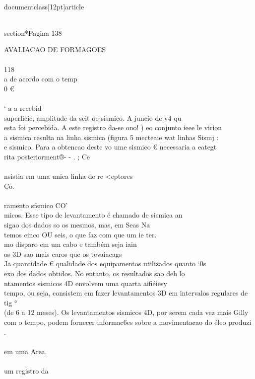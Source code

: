 \\documentclass[12pt]{article}
\begin{document}
\\section*{Pagina 138}

AVALIACAO DE FORMAGOES\\
\\
118\\
a de acordo com o temp\\
0 €\\
\\
‘ a a recebid\\
superficie, amplitude da seit oe sismico. A juncio de v4 qu\\
esta foi percebida. A este registro da-se ono! ) eo conjunto ieee le virion\\
a sismica resulta na linha sismica (figura 5 mecteaie wat linhas Sismj :\\
e sismico. Para a obtencao deste vo ume sismico € necessaria a eategt\\
rita posteriorment®- - . ; Ce\\
\\
nsistia em uma unica linha de re <eptores\\
Co.\\
\\
ramento sfsmico CO’\\
micos. Esse tipo de levantamento é chamado de sismica an\\
sigao dos dados so os mesmos, mas, em Seas Na\\
temos cinco OU seis, o que faz com que um ie ter.\\
mo disparo em um cabo e também seja iain\\
os 3D sao mais caros que os tevaiacags\\
Ja quantidade € qualidade dos equipamentos utilizados quanto ‘0s\\
exo dos dados obtidos. No entanto, os resultados sao deh lo\\
ntamentos sismicos 4D envolvem uma quarta aifiéiesy\\
tempo, ou seja, consistem em fazer levantamentos 3D em intervalos regulares de tig °\\
(de 6 a 12 meses). Os levantamentos sismicos 4D, por serem cada vez mais Gilly\\
com o tempo, podem fornecer informac6es sobre a movimenta¢ao do éleo produzi .\\
\\
em uma Area.\\
\\
um registro da\\
\\
\end{document}
